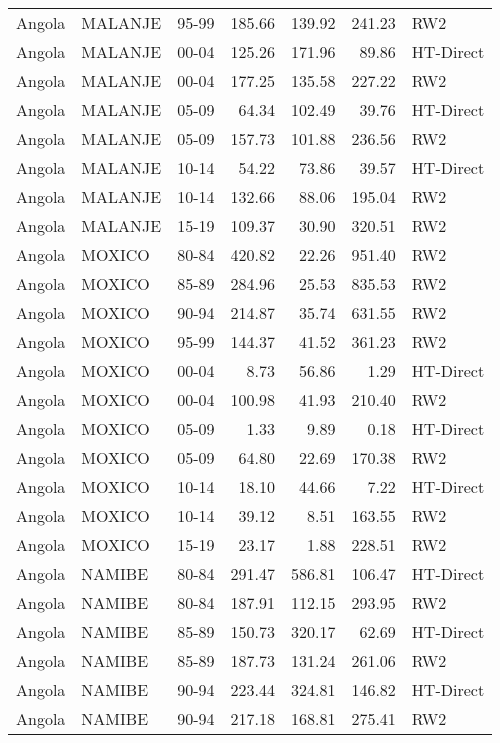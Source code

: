 \begin{longtable}{lllrrrl}
  Angola & MALANJE & 95-99 & 185.66 & 139.92 & 241.23 & RW2 \\ 
  Angola & MALANJE & 00-04 & 125.26 & 171.96 & 89.86 & HT-Direct \\ 
  Angola & MALANJE & 00-04 & 177.25 & 135.58 & 227.22 & RW2 \\ 
  Angola & MALANJE & 05-09 & 64.34 & 102.49 & 39.76 & HT-Direct \\ 
  Angola & MALANJE & 05-09 & 157.73 & 101.88 & 236.56 & RW2 \\ 
  Angola & MALANJE & 10-14 & 54.22 & 73.86 & 39.57 & HT-Direct \\ 
  Angola & MALANJE & 10-14 & 132.66 & 88.06 & 195.04 & RW2 \\ 
  Angola & MALANJE & 15-19 & 109.37 & 30.90 & 320.51 & RW2 \\ 
  Angola & MOXICO & 80-84 & 420.82 & 22.26 & 951.40 & RW2 \\ 
  Angola & MOXICO & 85-89 & 284.96 & 25.53 & 835.53 & RW2 \\ 
  Angola & MOXICO & 90-94 & 214.87 & 35.74 & 631.55 & RW2 \\ 
  Angola & MOXICO & 95-99 & 144.37 & 41.52 & 361.23 & RW2 \\ 
  Angola & MOXICO & 00-04 & 8.73 & 56.86 & 1.29 & HT-Direct \\ 
  Angola & MOXICO & 00-04 & 100.98 & 41.93 & 210.40 & RW2 \\ 
  Angola & MOXICO & 05-09 & 1.33 & 9.89 & 0.18 & HT-Direct \\ 
  Angola & MOXICO & 05-09 & 64.80 & 22.69 & 170.38 & RW2 \\ 
  Angola & MOXICO & 10-14 & 18.10 & 44.66 & 7.22 & HT-Direct \\ 
  Angola & MOXICO & 10-14 & 39.12 & 8.51 & 163.55 & RW2 \\ 
  Angola & MOXICO & 15-19 & 23.17 & 1.88 & 228.51 & RW2 \\ 
  Angola & NAMIBE & 80-84 & 291.47 & 586.81 & 106.47 & HT-Direct \\ 
  Angola & NAMIBE & 80-84 & 187.91 & 112.15 & 293.95 & RW2 \\ 
  Angola & NAMIBE & 85-89 & 150.73 & 320.17 & 62.69 & HT-Direct \\ 
  Angola & NAMIBE & 85-89 & 187.73 & 131.24 & 261.06 & RW2 \\ 
  Angola & NAMIBE & 90-94 & 223.44 & 324.81 & 146.82 & HT-Direct \\ 
  Angola & NAMIBE & 90-94 & 217.18 & 168.81 & 275.41 & RW2 \\ 

\end{longtable}

